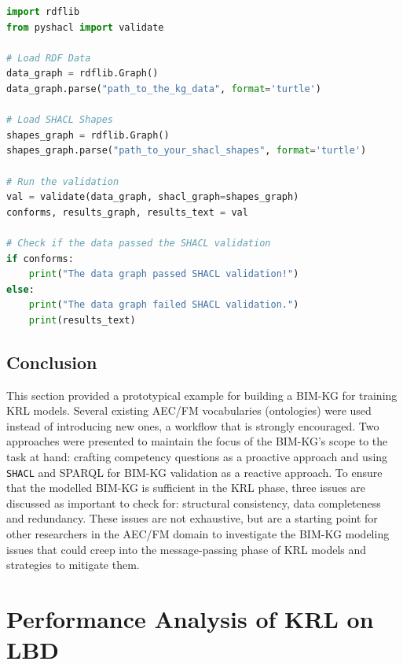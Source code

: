 \begin{lstlisting}[language=python, caption={Python script for loading \ac{RDF} data and \ac{SHACL} shapes for validating a knowledge graph}, label=lst:rdf-and-shapes-loading]
import rdflib
from pyshacl import validate

# Load RDF Data
data_graph = rdflib.Graph()
data_graph.parse("path_to_the_kg_data", format='turtle')

# Load SHACL Shapes
shapes_graph = rdflib.Graph()
shapes_graph.parse("path_to_your_shacl_shapes", format='turtle')

# Run the validation
val = validate(data_graph, shacl_graph=shapes_graph)
conforms, results_graph, results_text = val

# Check if the data passed the SHACL validation
if conforms:
    print("The data graph passed SHACL validation!")
else:
    print("The data graph failed SHACL validation.")
    print(results_text)

\end{lstlisting}

\subsection{Conclusion}
This section provided a prototypical example for building a \ac{BIM-KG} for training \ac{KRL} models. Several existing \ac{AEC/FM} vocabularies (ontologies) were used instead of introducing new ones, a workflow that is strongly encouraged. Two approaches were presented to maintain the focus of the \ac{BIM-KG}'s scope to the task at hand: crafting competency questions as a proactive approach and using \texttt{SHACL} and \ac{SPARQL} for \ac{BIM-KG} validation as a reactive approach. To ensure that the modelled \ac{BIM-KG} is sufficient in the \ac{KRL} phase, three issues are discussed as important to check for: structural consistency, data completeness and redundancy. These issues are not exhaustive, but are a starting point for other researchers in the \ac{AEC/FM} domain to investigate the \ac{BIM-KG} modeling issues that could creep into the message-passing phase of \ac{KRL} models and strategies to mitigate them. 

\section{Performance Analysis of \acf{KRL} on \acf{LBD}}\label{sec: relational-learning}


